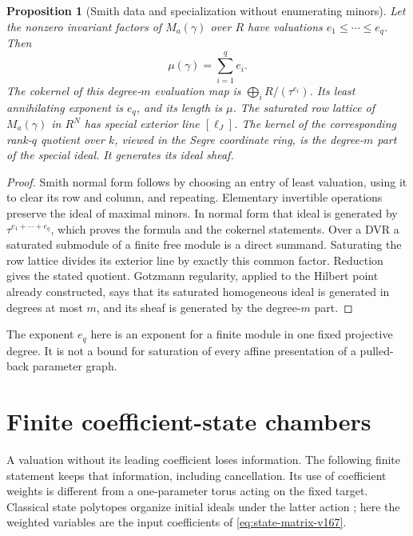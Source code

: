 \documentclass[11pt,reqno]{amsart}
\numberwithin{equation}{section}
\newtheorem{proposition}[theorem]{Proposition}
\theoremstyle{definition}\newtheorem{definition}[theorem]{Definition}
\theoremstyle{remark}\newtheorem{remark}[theorem]{Remark}
\begin{document}
\begin{proposition}[Smith data and specialization without enumerating minors]
\label{prop:smith-v167}
Let the nonzero invariant factors of $M_a(\gamma)$ over $R$ have
valuations $e_1\leq\cdots\leq e_q$. Then
\[
 \mu(\gamma)=\sum_{i=1}^q e_i.
\]
The cokernel of this degree-$m$ evaluation map is
$\bigoplus_i R/(\tau^{e_i})$. Its least annihilating exponent is
$e_q$, and its length is $\mu$. The saturated row lattice of
$M_a(\gamma)$ in $R^N$ has special exterior line $[\ell_J]$.
The kernel of the corresponding rank-$q$ quotient over $k$,
viewed in the Segre coordinate ring, is the degree-$m$ part of the
special ideal. It generates its ideal sheaf.
\end{proposition}
\begin{proof}
Smith normal form follows by choosing an entry of least valuation,
using it to clear its row and column, and repeating. Elementary
invertible operations preserve the ideal of maximal minors. In
normal form that ideal is generated by
$\tau^{e_1+\cdots+e_q}$, which proves the formula and the cokernel
statements. Over a DVR a saturated submodule of a finite free
module is a direct summand. Saturating the row lattice divides
its exterior line by exactly this common factor. Reduction gives
the stated quotient. Gotzmann regularity, applied to the Hilbert
point already constructed, says that its saturated homogeneous
ideal is generated in degrees at most $m$, and its sheaf is
generated by the degree-$m$ part.
\end{proof}
The exponent $e_q$ here is an exponent for a finite module in one
fixed projective degree. It is not a bound for saturation of every
affine presentation of a pulled-back parameter graph.

\section{Finite coefficient-state chambers}
\label{sec:state-fan-v167}
A valuation without its leading coefficient loses information.
The following finite statement keeps that information, including
cancellation. Its use of coefficient weights is different from a
one-parameter torus acting on the fixed target. Classical state
polytopes organize initial ideals under the latter action
\cite{BayerMorrison167}; here the weighted variables are the input
coefficients of \eqref{eq:state-matrix-v167}.
\end{document}
